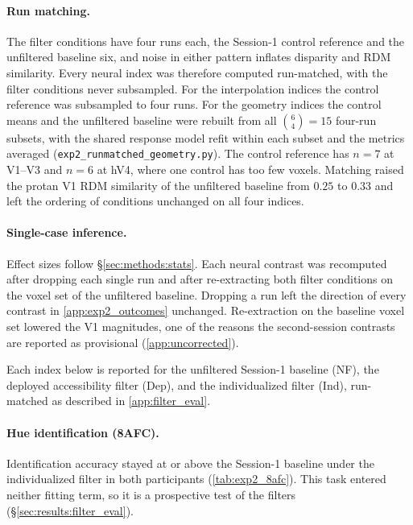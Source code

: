 \paragraph{Run matching.}
The filter conditions have four runs each, the Session-1 control reference and the unfiltered baseline six, and noise in either pattern inflates disparity and RDM similarity. Every neural index was therefore computed run-matched, with the filter conditions never subsampled. For the interpolation indices the control reference was subsampled to four runs. For the geometry indices the control means and the unfiltered baseline were rebuilt from all $\binom{6}{4} = 15$ four-run subsets, with the shared response model refit within each subset and the metrics averaged (\texttt{exp2\_runmatched\_geometry.py}). The control reference has $n = 7$ at V1--V3 and $n = 6$ at hV4, where one control has too few voxels. Matching raised the protan V1 RDM similarity of the unfiltered baseline from $0.25$ to $0.33$ and left the ordering of conditions unchanged on all four indices.

\paragraph{Single-case inference.}
Effect sizes follow \S\ref{sec:methods:stats}. Each neural contrast was recomputed after dropping each single run and after re-extracting both filter conditions on the voxel set of the unfiltered baseline. Dropping a run left the direction of every contrast in \cref{app:exp2_outcomes} unchanged. Re-extraction on the baseline voxel set lowered the V1 magnitudes, one of the reasons the second-session contrasts are reported as provisional (\cref{app:uncorrected}).


Each index below is reported for the unfiltered Session-1 baseline (NF), the deployed accessibility filter (Dep), and the individualized filter (Ind), run-matched as described in \cref{app:filter_eval}.

\paragraph{Hue identification (8AFC).}
Identification accuracy stayed at or above the Session-1 baseline under the individualized filter in both participants (\cref{tab:exp2_8afc}). This task entered neither fitting term, so it is a prospective test of the filters (\S\ref{sec:results:filter_eval}).

